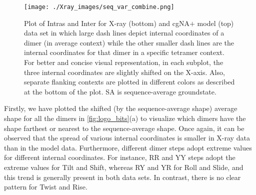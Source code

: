 \begin{figure}[htb!]
	\begin{center}
	\centering\texttt{[image: ./Xray\_images/seq\_var\_combine.png]}
	\centering\caption{Plot of Intras and Inter for X-ray (bottom) and cgNA$+$ model (top) data set in which large dash lines depict internal coordinates of a dimer (in average context) while the other smaller dash lines are the internal coordinates for that dimer in a specific tetramer context. For better and concise visual representation, in each subplot, the three internal coordinates are slightly shifted on the X-axis. Also, separate flanking contexts are plotted in different colors as described at the bottom of the plot. SA is sequence-average groundstate.
	}
\label{fig:seq_imp2}
\end{center}
\end{figure}


Firstly, we have plotted the shifted (by the sequence-average shape) average shape for all the dimers in \cref{fig:logo_bits}(a) to visualize which dimers have the shape farthest or nearest to the sequence-average shape.
Once again, it can be observed that the spread of various internal coordinates is smaller in X-ray data than in the model data.
Furthermore, different dimer steps adopt extreme values for different internal coordinates.
For instance, RR and YY steps adopt the extreme values for Tilt and Shift, whereas RY and YR for Roll and Slide, and this trend is generally present in both data sets. 
In contrast, there is no clear pattern for Twist and Rise.

